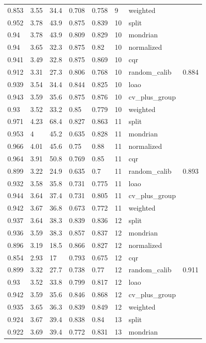 \begin{tabular}{llllllll}
0.853 & 3.55 & 34.4 & 0.708 & 0.758 & 9 & weighted &  \\
0.952 & 3.78 & 43.9 & 0.875 & 0.839 & 10 & split &  \\
0.94 & 3.78 & 43.9 & 0.809 & 0.829 & 10 & mondrian &  \\
0.94 & 3.65 & 32.3 & 0.875 & 0.82 & 10 & normalized &  \\
0.941 & 3.49 & 32.8 & 0.875 & 0.869 & 10 & cqr &  \\
0.912 & 3.31 & 27.3 & 0.806 & 0.768 & 10 & random\_calib & 0.884 \\
0.939 & 3.54 & 34.4 & 0.844 & 0.825 & 10 & loao &  \\
0.943 & 3.59 & 35.6 & 0.875 & 0.876 & 10 & cv\_plus\_group &  \\
0.93 & 3.52 & 33.2 & 0.85 & 0.779 & 10 & weighted &  \\
0.971 & 4.23 & 68.4 & 0.827 & 0.863 & 11 & split &  \\
0.953 & 4 & 45.2 & 0.635 & 0.828 & 11 & mondrian &  \\
0.966 & 4.01 & 45.6 & 0.75 & 0.88 & 11 & normalized &  \\
0.964 & 3.91 & 50.8 & 0.769 & 0.85 & 11 & cqr &  \\
0.899 & 3.22 & 24.9 & 0.635 & 0.7 & 11 & random\_calib & 0.893 \\
0.932 & 3.58 & 35.8 & 0.731 & 0.775 & 11 & loao &  \\
0.944 & 3.64 & 37.4 & 0.731 & 0.805 & 11 & cv\_plus\_group &  \\
0.942 & 3.67 & 36.8 & 0.673 & 0.772 & 11 & weighted &  \\
0.937 & 3.64 & 38.3 & 0.839 & 0.836 & 12 & split &  \\
0.936 & 3.59 & 38.3 & 0.857 & 0.837 & 12 & mondrian &  \\
0.896 & 3.19 & 18.5 & 0.866 & 0.827 & 12 & normalized &  \\
0.854 & 2.93 & 17 & 0.793 & 0.675 & 12 & cqr &  \\
0.899 & 3.32 & 27.7 & 0.738 & 0.77 & 12 & random\_calib & 0.911 \\
0.93 & 3.52 & 33.8 & 0.799 & 0.817 & 12 & loao &  \\
0.942 & 3.59 & 35.6 & 0.846 & 0.868 & 12 & cv\_plus\_group &  \\
0.935 & 3.65 & 36.3 & 0.839 & 0.849 & 12 & weighted &  \\
0.924 & 3.67 & 39.4 & 0.838 & 0.84 & 13 & split &  \\
0.922 & 3.69 & 39.4 & 0.772 & 0.831 & 13 & mondrian &  \\

\end{tabular}
